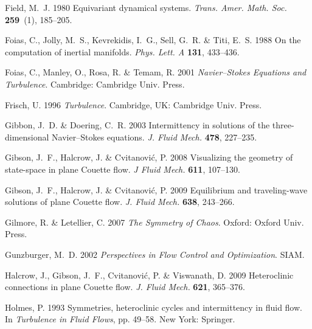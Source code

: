 \documentclass{jfm}
\begin{document}
\begin{thebibliography}{73}
{\sc Field, M.~J.} 1980 Equivariant dynamical systems. {\em Trans. Amer. Math.
  Soc.\/} {\bf 259}~(1), 185--205.

{\sc Foias, C., Jolly, M.~S., Kevrekidis, I.~G., Sell, G.~R. \& Titi, E.~S.}
  1988 On the computation of inertial manifolds. {\em Phys. Lett. A\/} {\bf
  131}, 433--436.

{\sc Foias, C., Manley, O., Rosa, R. \& Temam, R.} 2001 {\em {Navier--Stokes}
  Equations and Turbulence\/}. Cambridge: Cambridge Univ. Press.

{\sc Frisch, U.} 1996 {\em Turbulence\/}. Cambridge, UK: Cambridge Univ. Press.

{\sc Gibbon, J.~D. \& Doering, C.~R.} 2003 Intermittency in solutions of the
  three-dimensional {N}avier--{S}tokes equations. {\em J. Fluid Mech.\/} {\bf
  478}, 227--235.

{\sc Gibson, J.~F., Halcrow, J. \& Cvitanovi{\'c}, P.} 2008 Visualizing the
  geometry of state-space in plane {Couette} flow. {\em J Fluid Mech.\/} {\bf
  611}, 107--130.

{\sc Gibson, J.~F., Halcrow, J. \& Cvitanovi{\'c}, P.} 2009 Equilibrium and
  traveling-wave solutions of plane {Couette} flow. {\em J. Fluid Mech.\/} {\bf
  638}, 243--266.

{\sc Gilmore, R. \& Letellier, C.} 2007 {\em The Symmetry of Chaos\/}. Oxford:
  Oxford Univ. Press.

{\sc Gunzburger, M.~D.} 2002 {\em Perspectives in Flow Control and
  Optimization\/}. SIAM.

{\sc Halcrow, J., Gibson, J.~F., Cvitanovi{\'c}, P. \& Viswanath, D.} 2009
  Heteroclinic connections in plane {C}ouette flow. {\em J. Fluid Mech.\/} {\bf
  621}, 365--376.

{\sc Holmes, P.} 1993 Symmetries, heteroclinic cycles and intermittency in
  fluid flow. In {\em Turbulence in Fluid Flows\/}, pp. 49--58. New York:
  Springer.


\end{thebibliography}
\end{document}
